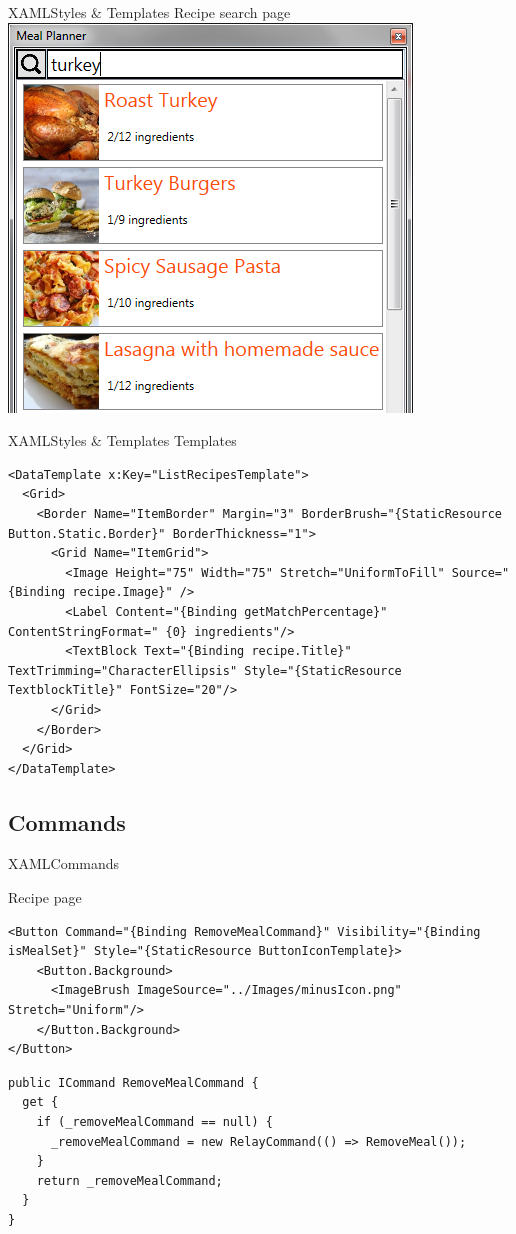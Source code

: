 \begin{frame}[fragile]{XAML}{Styles \& Templates}
  Recipe search page
  \includegraphics[width=.75\textwidth]{graphics/recipe-search-item.png}
\end{frame}

\begin{frame}[fragile]{XAML}{Styles \& Templates}
Templates
\begin{lstlisting}
<DataTemplate x:Key="ListRecipesTemplate">
  <Grid>
    <Border Name="ItemBorder" Margin="3" BorderBrush="{StaticResource Button.Static.Border}" BorderThickness="1">
      <Grid Name="ItemGrid">
        <Image Height="75" Width="75" Stretch="UniformToFill" Source="{Binding recipe.Image}" />
        <Label Content="{Binding getMatchPercentage}" ContentStringFormat=" {0} ingredients"/>
        <TextBlock Text="{Binding recipe.Title}" TextTrimming="CharacterEllipsis" Style="{StaticResource TextblockTitle}" FontSize="20"/>
      </Grid>
    </Border>
  </Grid>
</DataTemplate>
\end{lstlisting}
\end{frame}

\subsection{Commands} 
\begin{frame}[fragile]{XAML}{Commands}

Recipe page
\begin{lstlisting}
<Button Command="{Binding RemoveMealCommand}" Visibility="{Binding isMealSet}" Style="{StaticResource ButtonIconTemplate}>
    <Button.Background>
      <ImageBrush ImageSource="../Images/minusIcon.png" Stretch="Uniform"/>
    </Button.Background>
</Button>
\end{lstlisting}

\begin{lstlisting}
public ICommand RemoveMealCommand {
  get {
    if (_removeMealCommand == null) {
      _removeMealCommand = new RelayCommand(() => RemoveMeal());
    }
    return _removeMealCommand;
  }
}
\end{lstlisting}
\end{frame}

